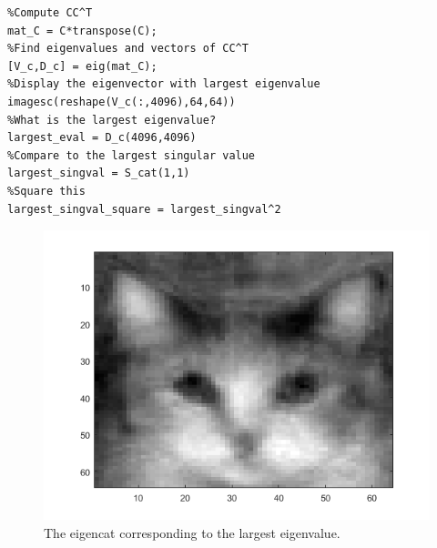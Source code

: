 \documentclass[leqno]{article}
\theoremstyle{nonumberplain}
\begin{document}
\begin{lstlisting}
%Compute CC^T
mat_C = C*transpose(C);
%Find eigenvalues and vectors of CC^T
[V_c,D_c] = eig(mat_C);
%Display the eigenvector with largest eigenvalue
imagesc(reshape(V_c(:,4096),64,64))
%What is the largest eigenvalue?
largest_eval = D_c(4096,4096)
%Compare to the largest singular value
largest_singval = S_cat(1,1)
%Square this
largest_singval_square = largest_singval^2
\end{lstlisting}

\begin{figure}[h]
\begin{center}
\includegraphics[scale=.4]{evector.png}
\caption{The eigencat corresponding to the largest eigenvalue.}
\end{center}
\end{figure}
\end{document}
